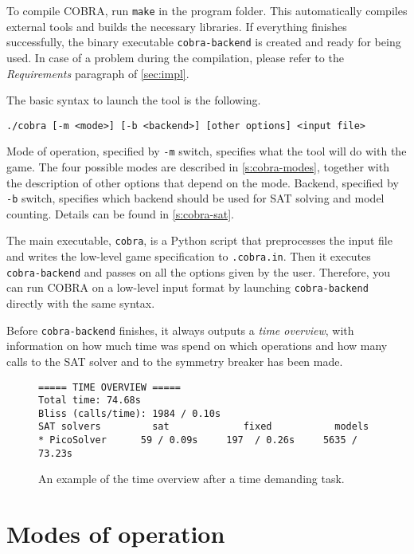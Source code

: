 To compile COBRA, run \texttt{make} in the program folder.
This automatically compiles external tools and builds the necessary libraries.
If everything finishes successfully,
  the binary executable \texttt{cobra-backend} is created
  and ready for being used.
In case of a problem during the compilation, please refer to the \emph{Requirements}
paragraph of \autoref{sec:impl}.

The basic syntax to launch the tool is the following.

\medskip
\centerline{\texttt{./cobra [-m <mode>] [-b <backend>] [other options] <input file>}}
\medskip

Mode of operation, specified by \texttt{-m} switch,
  specifies what the tool will do with the game.
The four possible modes are described in \autoref{s:cobra-modes},
  together with the description
  of other options that depend on the mode.
Backend, specified by \texttt{-b} switch, specifies which backend should be
  used for SAT solving and model counting.
Details can be found in \autoref{s:cobra-sat}.

The main executable, \texttt{cobra}, is a Python script that preprocesses
  the input file and writes the low-level game specification to \texttt{.cobra.in}.
Then it executes \texttt{cobra-backend} and passes on all the options given
  by the user.
Therefore, you can run COBRA on a low-level input format by launching
  \texttt{cobra-backend} directly with the same syntax.

Before \texttt{cobra-backend} finishes, it always outputs a \emph{time overview},
  with information on how much time was spend on which operations and
  how many calls to the SAT solver and to the symmetry breaker has been made.

\begin{figure}[ht]
\begin{lstlisting}
===== TIME OVERVIEW =====
Total time: 74.68s
Bliss (calls/time): 1984 / 0.10s
SAT solvers         sat             fixed           models
* PicoSolver      59 / 0.09s     197  / 0.26s     5635 / 73.23s
\end{lstlisting}
\caption{An example of the time overview after a time demanding task.}
\label{fig:timeoverview}
\end{figure}


\section{Modes of operation}\label{s:cobra-modes}

